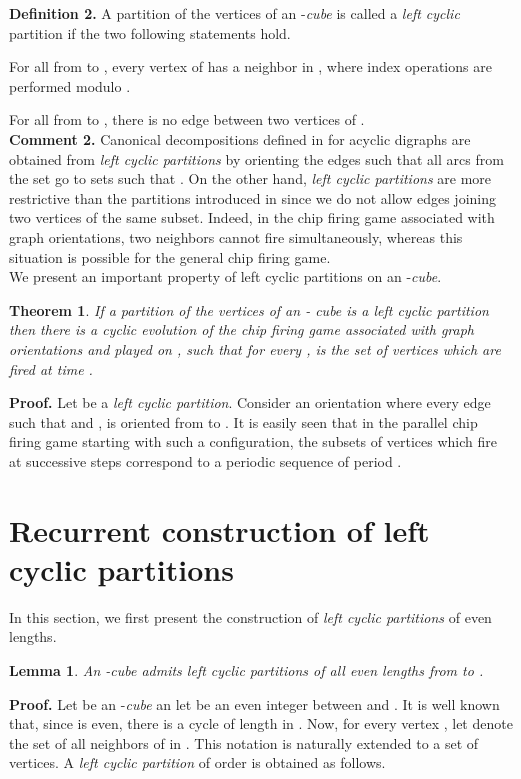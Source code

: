 \documentclass{article}
\newtheorem{theorem}{Theorem}
\newtheorem{lemma}{Lemma}
\begin{document}
{\bf Definition 2.} A partition  of the
vertices of an -{\em cube} is called a {\em left cyclic} partition if the
two following statements hold.

 For all  from  to , every vertex of  has a
neighbor in , where index operations are performed modulo .

 For all  from  to , there is no edge between two
vertices of .\vspace{2mm}\\
{\bf Comment 2.} Canonical decompositions defined in \cite{GOL:00} for
acyclic digraphs are obtained from {\em left cyclic partitions} by orienting
the edges such that all arcs from the set  go to sets
 such that . On the other hand, {\em left cyclic partitions} are more
restrictive than the partitions introduced in \cite{PRI:94} since we do not
allow edges joining two vertices of the same subset. Indeed, in the chip
firing game associated with graph orientations, two neighbors cannot fire
simultaneously, whereas this situation is possible for the general chip firing
game. \\

We present an important property of left cyclic partitions on an -{\em cube}.

\begin{theorem}
If a partition  of the vertices of an -
  cube  is a left cyclic partition then there is a
  cyclic evolution of the chip firing game associated with graph orientations
  and played on , such that for every ,  is the set of
  vertices which are fired at time .
\end{theorem}
{\bf Proof.} Let  be a {\em left cyclic partition}. Consider
an orientation where every edge  such that  and , is oriented from  to . It is easily seen that in the parallel chip
firing game starting with such a configuration, the subsets of vertices
which fire at successive steps correspond to a periodic sequence of period
.\\


\section{Recurrent construction of left cyclic partitions}
In this section, we first present the construction of {\em left cyclic
  partitions} of even lengths.
\begin{lemma}   \label{lem:allpair}
An -cube admits left cyclic partitions of all even lengths from
 to .
\end{lemma}
{\bf Proof.} Let  be an -{\em cube} an let  be an even
integer between  and . It is well known that, since  is even,
there is a cycle 
of length  in . Now, for every vertex , let  denote the
set of all neighbors of  in . This notation is naturally extended to a
set of vertices. A {\em left cyclic partition} of order  is
obtained  as follows.
\end{document}

